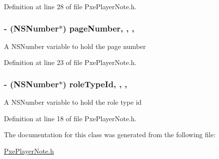 Definition at line 28 of file Pxe\-Player\-Note.\-h.

\hypertarget{interface_pxe_player_note_a3eafbc276f2d28a0c68bc0f2751b9a37}{
\subsubsection[{page\-Number}]{\setlength{\rightskip}{0pt plus 5cm}-\/ (N\-S\-Number$\ast$) page\-Number\hspace{0.3cm}{\ttfamily [read]}, {\ttfamily [write]}, {\ttfamily [nonatomic]}, {\ttfamily [strong]}}}\label{interface_pxe_player_note_a3eafbc276f2d28a0c68bc0f2751b9a37}
A N\-S\-Number variable to hold the page number 

Definition at line 23 of file Pxe\-Player\-Note.\-h.

\hypertarget{interface_pxe_player_note_ae94729dccdfac2f038673a971b74aca2}{
\subsubsection[{role\-Type\-Id}]{\setlength{\rightskip}{0pt plus 5cm}-\/ (N\-S\-Number$\ast$) role\-Type\-Id\hspace{0.3cm}{\ttfamily [read]}, {\ttfamily [write]}, {\ttfamily [nonatomic]}, {\ttfamily [strong]}}}\label{interface_pxe_player_note_ae94729dccdfac2f038673a971b74aca2}
A N\-S\-Number variable to hold the role type id 

Definition at line 18 of file Pxe\-Player\-Note.\-h.



The documentation for this class was generated from the following file\-:\begin{DoxyCompactItemize}
\item 
\hyperlink{_pxe_player_note_8h}{Pxe\-Player\-Note.\-h}\end{DoxyCompactItemize}
